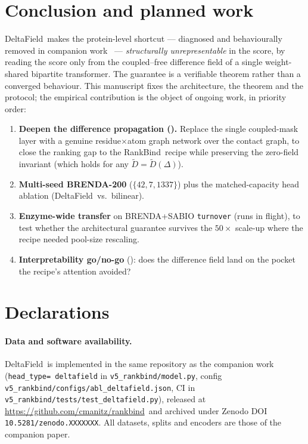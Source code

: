 \documentclass[11pt,a4paper]{article}
\newcommand{\df}{DeltaField\xspace}
\newcommand{\method}{RankBind\xspace}
\newcommand{\repourl}{\url{https://github.com/cmanitz/rankbind}}
\newcommand{\zenododoi}{10.5281/zenodo.XXXXXXX}
\begin{document}
\section{Conclusion and planned work}
\label{sec:future}

\df\ makes the protein-level shortcut --- diagnosed and behaviourally removed
in companion work~\citep{manitz2026rankbind} --- \emph{structurally
unrepresentable} in the score, by reading the score only from the coupled--free
difference field of a single weight-shared bipartite transformer. The
guarantee is a verifiable theorem rather than a converged behaviour. This
manuscript fixes the architecture, the theorem and the protocol; the empirical
contribution is the object of ongoing work, in priority order:
\begin{enumerate}[leftmargin=*,itemsep=1pt,topsep=2pt]
  \item \textbf{Deepen the difference propagation ().} Replace
        the single coupled-mask layer with a genuine residue$\times$atom
        graph network over the contact graph, to close the ranking gap to the
        \method\ recipe while preserving the zero-field invariant (which holds
        for any $\tilde{D}=\tilde{D}(\Delta)$).
  \item \textbf{Multi-seed BRENDA-200} ($\{42,7,1337\}$) plus the
        matched-capacity head ablation (\df\ vs.\ bilinear).
  \item \textbf{Enzyme-wide transfer} on BRENDA+SABIO \texttt{turnover}
        (runs in flight), to test whether the architectural guarantee
        survives the $50\times$ scale-up where the recipe needed pool-size
        rescaling.
  \item \textbf{Interpretability go/no-go} (): does the
        difference field land on the pocket the recipe's attention avoided?
\end{enumerate}

\section*{Declarations}

\paragraph{Data and software availability.}
\df\ is implemented in the same repository as the companion
work~\citep{manitz2026rankbind} (\texttt{head\_type=\textquotesingle
deltafield\textquotesingle} in \texttt{v5\_rankbind/model.py}, config
\texttt{v5\_rankbind/configs/abl\_deltafield.json}, CI in
\texttt{v5\_rankbind/tests/test\_deltafield.py}), released at \repourl\ and
archived under Zenodo DOI \texttt{\zenododoi}. All datasets, splits and
encoders are those of the companion paper.
\end{document}
